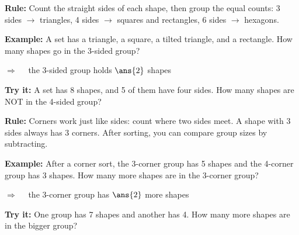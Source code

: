 \documentclass[12pt]{article}
\begin{document}


\begin{formulabox}
\textbf{Rule:} Count the straight sides of each shape, then group the equal
counts: 3 sides $\to$ triangles, 4 sides $\to$ squares and rectangles,
6 sides $\to$ hexagons.
\end{formulabox}

\begin{examplebox}
\textbf{Example:} \quad A set has a triangle, a square, a tilted triangle,
and a rectangle. How many shapes go in the 3-sided group?

$\Rightarrow\quad$ the 3-sided group holds $\ans{2}$ shapes
\end{examplebox}

\begin{tryitbox}
\textbf{Try it:} \quad A set has 8 shapes, and 5 of them have four sides.
How many shapes are NOT in the 4-sided group?\\[2pt]
\end{tryitbox}


\begin{formulabox}
\textbf{Rule:} Corners work just like sides: count where two sides meet.
A shape with 3 sides always has 3 corners. After sorting, you can compare
group sizes by subtracting.
\end{formulabox}

\begin{examplebox}
\textbf{Example:} \quad After a corner sort, the 3-corner group has 5 shapes
and the 4-corner group has 3 shapes. How many more shapes are in the
3-corner group?

$\Rightarrow\quad$ the 3-corner group has $\ans{2}$ more shapes
\end{examplebox}

\begin{tryitbox}
\textbf{Try it:} \quad One group has 7 shapes and another has 4. How many
more shapes are in the bigger group?\\[2pt]
\end{tryitbox}
\end{document}
